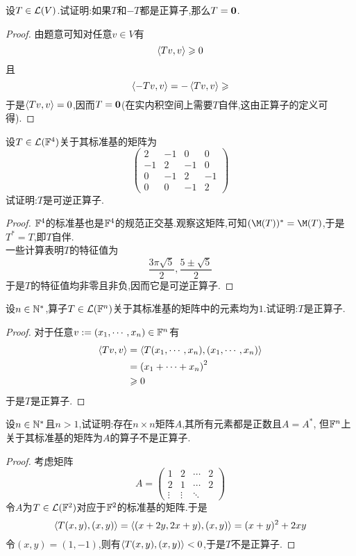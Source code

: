 \documentclass{ctexart}
\begin{document}
\pagestyle{empty}
\begin{center}
    \large{}
\end{center}
\begin{problem}[1.]
    设$T\in\mathcal{L}(V)$.试证明:如果$T$和$-T$都是正算子,那么$T=\mathbf0$.
\end{problem}
\begin{proof}
    由题意可知对任意$v\in V$有
    \[\left\langle{Tv},{v}\right\rangle\geqslant0\]
    且
    \[\left\langle{-Tv},{v}\right\rangle=-\left\langle{Tv},{v}\right\rangle\geqslant\]
    于是$\left\langle{Tv},{v}\right\rangle=0$,因而$T=\mathbf0$(在实内积空间上需要$T$自伴,这由正算子的定义可得).
\end{proof}
\begin{problem}[2.]
    设$T\in\mathcal{L}(\mathbb{F}^4)$关于其标准基的矩阵为
    \[\begin{pmatrix}
        2&-1&0&0\\
        -1&2&-1&0\\
        0&-1&2&-1\\
        0&0&-1&2
    \end{pmatrix}\]
    试证明:$T$是可逆正算子.
\end{problem}
\begin{proof}
    $\mathbb{F}^4$的标准基也是$\mathbb{F}^4$的规范正交基.观察这矩阵,可知$(\M(T))^*=\M(T)$,于是$T^*=T$,即$T$自伴.\\
    一些计算表明$T$的特征值为
    \[\dfrac{3\pi\sqrt5}{2},\dfrac{5\pm\sqrt5}{2}\]
    于是$T$的特征值均非零且非负,因而它是可逆正算子.
\end{proof}
\begin{problem}[3.]
    设$n\in\mathbb{N}^*$,算子$T\in\mathcal{L}(\mathbb{F}^n)$关于其标准基的矩阵中的元素均为$1$.试证明:$T$是正算子.
\end{problem}
\begin{proof}
    对于任意$v:=({x}_1,\cdots,{x}_{n})\in\mathbb{F}^n$有
    \[\begin{aligned}
        \left\langle{Tv},{v}\right\rangle
        &= \left\langle{T({x}_1,\cdots,{x}_{n})},{({x}_1,\cdots,{x}_{n})}\right\rangle \\
        &= \left({x}_1+\cdots+{x}_{n}\right)^2 \\
        &\geqslant 0
    \end{aligned}\]
    于是$T$是正算子.
\end{proof}
\begin{problem}[4.]
    设$n\in\mathbb{N}^*$且$n>1$,试证明:存在$n\times n$矩阵$A$,其所有元素都是正数且$A=A^*$,%
    但$\mathbb{F}^n$上关于其标准基的矩阵为$A$的算子不是正算子.
\end{problem}
\begin{proof}
    考虑矩阵
    \[A=\begin{pmatrix}
        1&2&\cdots&2\\
        2&1&\cdots&2\\
        \vdots&\vdots&\ddots&
    \end{pmatrix}\]
    令$A$为$T\in\mathcal{L}(\mathbb{F}^2)$对应于$\mathbb{F}^2$的标准基的矩阵.于是
    \[\left\langle{T(x,y)},{(x,y)}\right\rangle
    =\left\langle{(x+2y,2x+y)},{(x,y)}\right\rangle
    =(x+y)^2+2xy\]
    令$(x,y)=(1,-1)$,则有$\left\langle{T(x,y)},{(x,y)}\right\rangle<0$,于是$T$不是正算子.
\end{proof}
\end{document}
